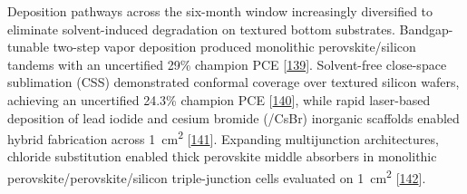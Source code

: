 \documentclass[
  11pt,
]{article}
\begin{document}
Deposition pathways across the six-month window increasingly diversified
to eliminate solvent-induced degradation on textured bottom substrates.
Bandgap-tunable two-step vapor deposition produced monolithic
perovskite/silicon tandems with an uncertified 29\% champion PCE
{[}\href{https://doi.org/10.1021/acsenergylett.6c00156}{139}{]}.
Solvent-free close-space sublimation (CSS) demonstrated conformal
coverage over textured silicon wafers, achieving an uncertified 24.3\%
champion PCE
{[}\href{https://doi.org/10.1038/s41560-026-02068-9}{140}{]}, while
rapid laser-based deposition of lead iodide and cesium bromide
(/CsBr) inorganic scaffolds enabled hybrid fabrication across
\qty{1}{\centi\meter\squared}
{[}\href{https://doi.org/10.1021/acsenergylett.5c04010}{141}{]}.
Expanding multijunction architectures, chloride substitution enabled
thick perovskite middle absorbers in monolithic
perovskite/perovskite/silicon triple-junction cells evaluated on
\qty{1}{\centi\meter\squared}
{[}\href{https://doi.org/10.1002/solr.70410}{142}{]}.
\end{document}
